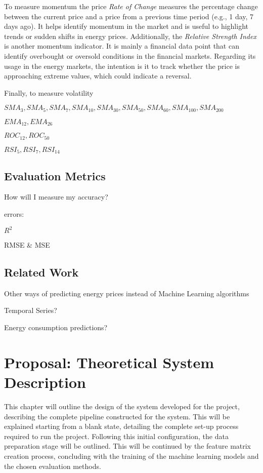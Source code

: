 \documentclass[12pt]{report} %
\begin{document}
To measure momentum the price \textit{Rate of Change} measures the percentage change between the current price and a price from a previous time period (e.g., 1 day, 7 days ago). It helps identify momentum in the market and is useful to highlight trends or sudden shifts in energy prices. Additionally, the \textit{Relative Strength Index} is another momentum indicator. It is mainly a financial data point that can identify overbought or oversold conditions in the financial markets. Regarding its usage in the energy markets, the intention is it to track whether the price is approaching extreme values, which could indicate a reversal.

Finally, to measure volatility
    
    $ SMA_3, SMA_5, SMA_7, SMA_{10}, SMA_{30}, SMA_{50}, SMA_{60}, SMA_{100}, SMA_{200} $
    
    $ EMA_{12}, EMA_{26} $
    
    $ ROC_{12}, ROC_{50} $
    
    $ RSI_5, RSI_7, RSI_{14} $

\section{Evaluation Metrics}
How will I measure my accuracy?

errors:

$ R^2 $

RMSE \& MSE

\section{Related Work}
Other ways of predicting energy prices instead of Machine Learning algorithms

Temporal Series?

Energy consumption predictions?





\chapter{Proposal: Theoretical System Description}

This chapter will outline the design of the system developed for the project, describing the complete pipeline constructed for the system. This will be explained starting from a blank state, detailing the complete set-up process required to run the project. Following this initial configuration, the data preparation stage will be outlined. This will be continued by the feature matrix creation process, concluding with the training of the machine learning models and the chosen evaluation methods.
\end{document}
